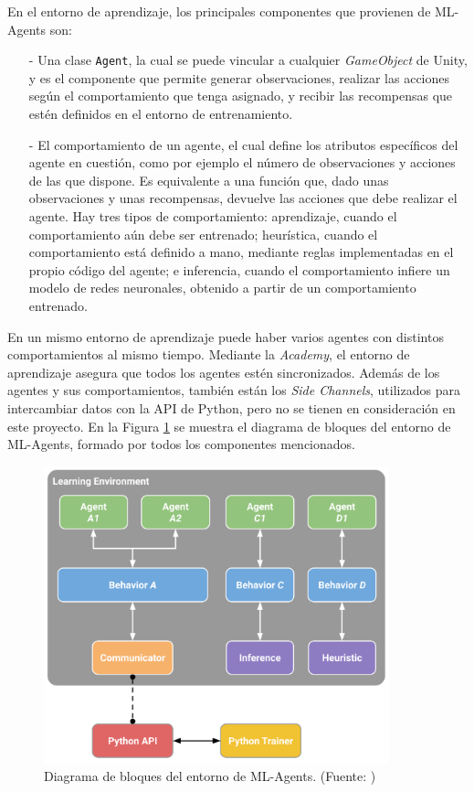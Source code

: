 En el entorno de aprendizaje, los principales componentes que provienen de ML-Agents son:
\begin{enumerate}
    \item[-] Una clase \texttt{Agent}, la cual se puede vincular a cualquier \emph{GameObject} de Unity, y es el componente que permite generar observaciones, realizar las acciones según el comportamiento que tenga asignado, y recibir las recompensas que estén definidos en el entorno de entrenamiento.
    \item[-] El comportamiento de un agente, el cual define los atributos específicos del agente en cuestión, como por ejemplo el número de observaciones y acciones de las que dispone. Es equivalente a una función que, dado unas observaciones y unas recompensas, devuelve las acciones que debe realizar el agente. Hay tres tipos de comportamiento: aprendizaje, cuando el comportamiento aún debe ser entrenado; heurística, cuando el comportamiento está definido a mano, mediante reglas implementadas en el propio código del agente; e inferencia, cuando el comportamiento infiere un modelo de redes neuronales, obtenido a partir de un comportamiento entrenado.
\end{enumerate}

En un mismo entorno de aprendizaje puede haber varios agentes con distintos comportamientos al mismo tiempo. Mediante la \emph{Academy}, el entorno de aprendizaje asegura que todos los agentes estén sincronizados. Además de los agentes y sus comportamientos, también están los \emph{Side Channels}, utilizados para intercambiar datos con la API de Python, pero no se tienen en consideración en este proyecto. En la Figura \ref{fig:ml-agents-diagram} se muestra el diagrama de bloques del entorno de ML-Agents, formado por todos los componentes mencionados.

\begin{figure}[H]
    \centering
    \includegraphics[width=10cm]{figures/learning_environment_example.png}
    \caption[Diagrama de bloques del entorno de ML-Agents]{Diagrama de bloques del entorno de ML-Agents. (Fuente: \cite{ml-agents-github})}
    \label{fig:ml-agents-diagram}
\end{figure}

